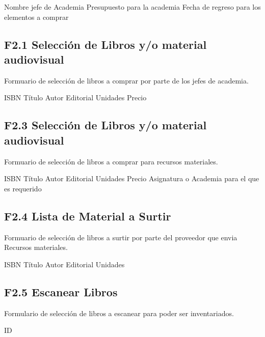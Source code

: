 \begin{UClist}
	\UCli Nombre jefe de Academia
	\UCli Presupuesto para la academia
	\UCli Fecha de regreso para los elementos a comprar
\end{UClist}

\subsection{F2.1 Selección de Libros y/o material audiovisual}
Formuario de selección de libros a comprar por parte de los jefes de academia.\\

\begin{UClist}
	\UCli ISBN
	\UCli Título
	\UCli Autor
	\UCli Editorial
	\UCli Unidades
	\UCli Precio
\end{UClist}

\subsection{F2.3 Selección de Libros y/o material audiovisual}
Formuario de selección de libros a comprar para recursos materiales.\\

\begin{UClist}
	\UCli ISBN
	\UCli Título
	\UCli Autor
	\UCli Editorial
	\UCli Unidades
	\UCli Precio
	\UCli Asignatura o Academia para el que es requerido
\end{UClist}


\subsection{F2.4 Lista de Material a Surtir}
Formuario de selección de libros a surtir por parte del proveedor que envia Recursos materiales.\\

\begin{UClist}
	\UCli ISBN
	\UCli Título
	\UCli Autor
	\UCli Editorial
	\UCli Unidades
\end{UClist}

\subsection{F2.5 Escanear Libros}
Formulario de selección de libros a escanear para poder ser inventariados.\\

\begin{UClist}
	\UCli ID
\end{UClist}

